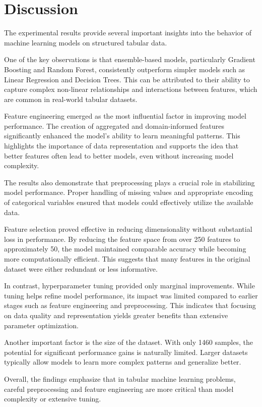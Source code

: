 \documentclass[conference]{IEEEtran}
\begin{document}
\section{Discussion}

The experimental results provide several important insights into the behavior of machine learning models on structured tabular data.

One of the key observations is that ensemble-based models, particularly Gradient Boosting and Random Forest, consistently outperform simpler models such as Linear Regression and Decision Trees. This can be attributed to their ability to capture complex non-linear relationships and interactions between features, which are common in real-world tabular datasets.

Feature engineering emerged as the most influential factor in improving model performance. The creation of aggregated and domain-informed features significantly enhanced the model's ability to learn meaningful patterns. This highlights the importance of data representation and supports the idea that better features often lead to better models, even without increasing model complexity.

The results also demonstrate that preprocessing plays a crucial role in stabilizing model performance. Proper handling of missing values and appropriate encoding of categorical variables ensured that models could effectively utilize the available data.

Feature selection proved effective in reducing dimensionality without substantial loss in performance. By reducing the feature space from over 250 features to approximately 50, the model maintained comparable accuracy while becoming more computationally efficient. This suggests that many features in the original dataset were either redundant or less informative.

In contrast, hyperparameter tuning provided only marginal improvements. While tuning helps refine model performance, its impact was limited compared to earlier stages such as feature engineering and preprocessing. This indicates that focusing on data quality and representation yields greater benefits than extensive parameter optimization.

Another important factor is the size of the dataset. With only 1460 samples, the potential for significant performance gains is naturally limited. Larger datasets typically allow models to learn more complex patterns and generalize better.

Overall, the findings emphasize that in tabular machine learning problems, careful preprocessing and feature engineering are more critical than model complexity or extensive tuning.
\end{document}
